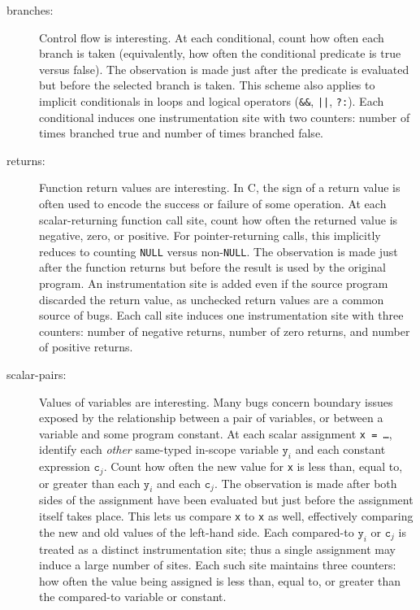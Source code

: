 \documentclass{sig-alternate}
\begin{document}
\begin{description}
\item[branches:] Control flow is interesting.  At each conditional,
  count how often each branch is taken (equivalently, how often the
  conditional predicate is true versus false).  The observation is
  made just after the predicate is evaluated but before the selected
  branch is taken.  This scheme also applies to implicit conditionals
  in loops and logical operators (\texttt{\&\&}, \texttt{||},
  \texttt{?:}).  Each conditional induces one instrumentation site
  with two counters: number of times branched true and number of times
  branched false.

\item[returns:] Function return values are interesting.  In C, the
  sign of a return value is often used to encode the success or failure of some
  operation.  At each scalar-returning function call site, count how
  often the returned value is negative, zero, or positive.  For
  pointer-returning calls, this implicitly reduces to counting
  \texttt{NULL} versus non-\texttt{NULL}.  The observation is made
  just after the function returns but before the result is used by the
  original program.  An instrumentation site is added even if the
  source program discarded the return value, as unchecked return
  values are a common source of bugs.  Each call site induces one
  instrumentation site with three counters: number of negative
  returns, number of zero returns, and number of positive returns.

\item[scalar-pairs:] Values of variables are interesting.  Many bugs
  concern boundary issues exposed by the relationship between a pair
  of variables, or between a variable and some program constant.  At
  each scalar assignment \texttt{x = \dots}, identify each
  \emph{other} same-typed in-scope variable $\mathtt{y}_i$ and each
  constant expression $\mathtt{c}_j$.  Count how often the new value
  for \texttt{x} is less than, equal to, or greater than each
  $\mathtt{y}_i$ and each $\mathtt{c}_j$.  The observation is made
  after both sides of the assignment have been evaluated but just
  before the assignment itself takes place.  This lets us compare
  \texttt{x} to \texttt{x} as well, effectively comparing the new and
  old values of the left-hand side.  Each compared-to $\mathtt{y}_i$
  or $\mathtt{c}_j$ is treated as a distinct instrumentation site;
  thus a single assignment may induce a large number of sites.  Each
  such site maintains three counters: how often the value being
  assigned is less than, equal to, or greater than the compared-to
  variable or constant.
\end{description}
\end{document}
